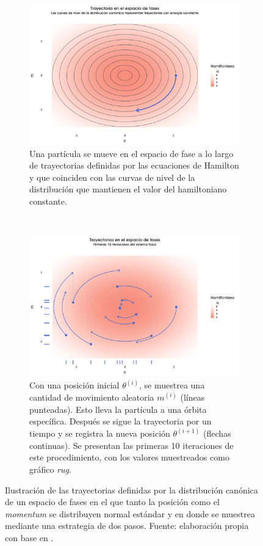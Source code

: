 \begin{figure}[h]
	\centering	
	\begin{subfigure}{0.4\textwidth}
        \includegraphics[width=\textwidth]{Figs/Bayes/Trayectoria_Espacio_Fase}
        \caption{Una partícula se mueve en el espacio de fase a lo largo de trayectorias definidas por las ecuaciones de Hamilton y que coinciden con las curvas de nivel de la distribución que mantienen el valor del hamiltoniano constante.}
        \label{fig:Primera_Trayectoria}
    \end{subfigure}
    ~ 
    \begin{subfigure}{0.4\textwidth}
        \includegraphics[width=\textwidth]{Figs/Bayes/Primeras_Trayectorias}
        \caption{Con una posición inicial $\theta^{(i)}$, se muestrea una cantidad de movimiento aleatoria $m^{(i)}$ (líneas punteadas). Esto lleva la partícula a una órbita específica. Después se sigue la trayectoria por un tiempo y se registra la nueva posición $\theta^{(i+1)}$ (flechas continuas). Se presentan las primeras 10 iteraciones de este procedimiento, con los valores muestreados como gráfico \textit{rug}.}
        \label{fig:Primeras_Trayectorias}
    \end{subfigure}
	\caption{Ilustración de las trayectorias definidas por la distribución canónica de un espacio de fases en el que tanto la posición como el \textit{momentum} se distribuyen normal estándar y en donde se muestrea mediante una estrategia de dos pasos. Fuente: elaboración propia con base en \textcite{Betancourt17}.}
	\label{fig:Trayectorias_Espacio_Fase}	
\end{figure}
 
